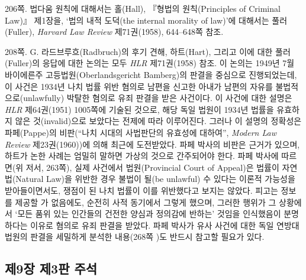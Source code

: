 {\noteentry 206쪽.  법다움 원칙에 대해서는 홀(Hall), 『형법의 원칙(Principles of Criminal
Law)』 제1장을, ‘법의 내적 도덕(the internal morality of law)’에
대해서는 풀러(Fuller), \emph{Harvard Law Review} 제71권(1958),
644--648쪽 참조.

\noteentry 208쪽.  G.
라드브루흐(Radbruch)의 후기 견해, 하트(Hart), 그리고 이에 대한
풀러(Fuller)의 응답에 대한 논의는 모두 \emph{HLR} 제71권(1958) 참조. 이
논의는 1949년 7월 바이에른주 고등법원(Oberlandsgericht Bamberg)의 판결을
중심으로 진행되었는데, 이 사건은 1934년 나치 법률 위반 혐의로 남편을
신고한 아내가 남편의 자유를 불법적으로(unlawfully) 박탈한 혐의로 유죄
판결을 받은 사건이다. 이 사건에 대한 설명은 \emph{HLR} 제64권(1951)
1005쪽에 기술된 것으로, 해당 독일 법원이 1934년 법률을 유효하지 않은
것(invalid)으로 보았다는 전제에 따라 이루어진다. 그러나 이 설명의
정확성은 파페(Pappe)의 비판(“나치 시대의 사법판단의 유효성에 대하여”,
\emph{Modern Law Review} 제23권(1960))에 의해 최근에 도전받았다. 파페
박사의 비판은 근거가 있으며, 하트가 논한 사례는 엄밀히 말하면 가상의
것으로 간주되어야 한다. 파페 박사에 따르면(위 저서, 263쪽), 실제
사건에서 법원(Provincial Court of Appeal)은 법률이 자연법(Natural Law)을
위반한 경우 불법이 될(be unlawful) 수 있다는 이론적 가능성을
받아들이면서도, 쟁점이 된 나치 법률이 이를 위반했다고 보지는 않았다.
피고는 정보를 제공할 가 없음에도, 순전히 사적 동기에서
그렇게 했으며, 그러한 행위가 그 상황에서 ‘모든 품위 있는 인간들의 건전한
양심과 정의감에 반하는’ 것임을 인식했음이 분명하다는 이유로  혐의로 유죄 판결을 받았다.
파페 박사가 유사 사건에 대한 독일 연방대법원의 판결을 세밀하게 분석한
내용(268쪽 )도 반드시 참고할 필요가 있다.

\subsection{제9장 제3판
주석}\label{uxc81c9uxc7a5-uxc81c3uxd310-uxc8fcuxc11d}

}
